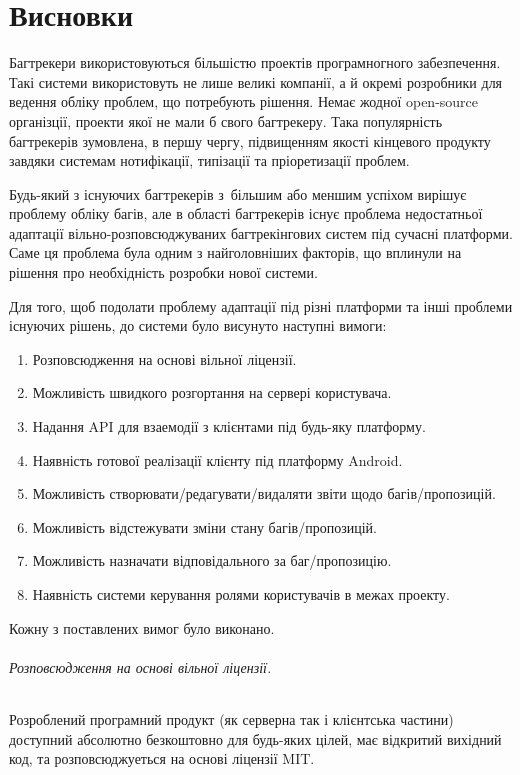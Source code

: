 \documentclass[../main.tex]{subfiles}
\begin{document}
\chapter*{Висновки}

Багтрекери використовуються більшістю проектів програмногного забезпечення. Такі системи використовуть не лише великі компанії, а й окремі розробники для ведення обліку проблем, що потребують рішення. Немає жодної open-source організції, проекти якої не мали б свого багтрекеру. Така популярність багтрекерів зумовлена, в першу чергу, підвищенням якості кінцевого продукту завдяки системам нотифікації, типізації та пріоретизації проблем.

Будь-який з існуючих багтрекерів з~більшим або меншим успіхом вирішує проблему обліку багів, але в області багтрекерів існує проблема недостатньої адаптації вільно-розповсюджуваних багтрекінгових систем під сучасні платформи. Саме ця проблема була одним з найголовніших факторів, що вплинули на рішення про необхідність розробки нової системи.

Для того, щоб подолати проблему адаптації під різні платформи та інші проблеми існуючих рішень, до системи було висунуто наступні вимоги:

\begin{enumerate}
	\item Розповсюдження на основі вільної ліцензії.
	\item Можливість швидкого розгортання на сервері користувача.
	\item Надання API для взаемодії з клієнтами під будь-яку платформу.
	\item Наявність готової реалізації клієнту під платформу Android.
	\item Можливість створювати/редагувати/видаляти звіти щодо багів/пропозицій.
	\item Можливість відстежувати зміни стану багів/пропозицій.
	\item Можливість назначати відповідального за баг/пропозицію.
	\item Наявність системи керування ролями користувачів в межах проекту.
\end{enumerate}

Кожну з поставлених вимог було виконано.

\subparagraph{Розповсюдження на основі вільної ліцензії.}
Розроблений програмний продукт (як серверна так і клієнтська частини) доступний абсолютно безкоштовно для будь-яких цілей, має відкритий вихідний код, та розповсюджуеться на основі ліцензії MIT.
\end{document}
